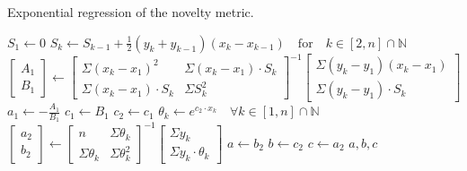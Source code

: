 \begin{algorithm}
    \caption{Exponential regression of the novelty metric.}
    \label{alg:expfit}
    \begin{algorithmic}[1]
      \State $S_1 \gets 0$
      \State $S_k \gets S_{k-1}+\frac{1}{2}(y_k+y_{k-1})(x_k-x_{k-1}) \quad \text{for} \quad k \in [2, n]\cap \mathbb{N}$
      \State $\begin{bmatrix}
        A_1 \\
        B_1        
      \end{bmatrix} \gets \begin{bmatrix}
        \Sigma(x_k-x_1)^2 & \Sigma(x_k-x_1)\cdot S_k \\
        \Sigma(x_k-x_1)\cdot S_k & \Sigma S_k^2        
      \end{bmatrix}^{-1}
      \begin{bmatrix}
        \Sigma(y_k-y_1)(x_k-x_1) \\
        \Sigma(y_k-y_1)\cdot S_k  
      \end{bmatrix}$
      \State $a_1 \gets -\frac{A_1}{B_1}$
        \State $c_1 \gets B_1$
        \State $c_2 \gets c_1$
        \State $\theta_k \gets e^{c_2\cdot x_k} \quad \forall k \in [1, n]\cap \mathbb{N}$
        \State $\begin{bmatrix}
            a_2 \\
            b_2
        \end{bmatrix} \gets 
        \begin{bmatrix}
            n & \Sigma \theta_k \\
            \Sigma \theta_k & \Sigma \theta_k^2
        \end{bmatrix}^{-1}
        \begin{bmatrix}
            \Sigma y_k \\
            \Sigma y_k \cdot \theta_k
        \end{bmatrix}$
        \State $a \gets b_2$
        \State $b \gets c_2$
        \State $c \gets a_2$
        \State \Return $a, b, c$
      \EndFunction
    \end{algorithmic}
  \end{algorithm}
  


